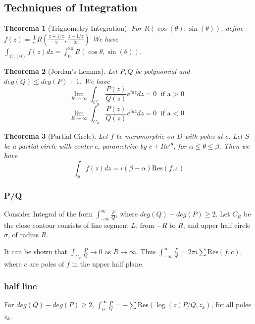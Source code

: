 \documentclass[12pt, a4paper]{article}
\newtheorem{theorem}{Theorema}[section]
\theoremstyle{definition}
\theoremstyle{remark}
\newcommand{\res}{\text{Res}}
\begin{document}

\subsection{Techniques of Integration} %
\label{sec:Techniques of Integration}

\begin{theorem}[Trignometry Integration]
For $ R(\cos(\theta), \sin(\theta))$, define $f(z) = \frac{1}{iz}R(\frac{z+1/z}{2}, \frac{z-1/z}{2i})$
We have $ \int_{C_1(0)} f(z) dz = \int^{2\pi}_{0} R(\cos{\theta}, \sin(\theta))$.
\end{theorem}

\begin{theorem}[Jordan's Lemma]
	Let $P,Q$ be polynomial and $deg(Q) \leq deg(P) + 1$. We have 
	$$
	\lim_{R \rightarrow  \infty} \int_{C_R^+} \frac{P(z)}{Q(z)} e^{iaz} dz = 0 \text{ if  a $>$ 0 }
	$$
	$$
	\lim_{R \rightarrow  \infty} \int_{C_R^-} \frac{P(z)}{Q(z)} e^{iaz} dz = 0 \text{ if a $<$ 0 }
	$$
\end{theorem}

\begin{theorem}[Partial Circle]
	Let $f$ be meromorphic on $D$ with poles at $c$. Let $S$ be a partial circle with center $c$, parametrize by $c + Re^{i\theta}$, for $\alpha \leq \theta \leq \beta$. Then we have 
	$$
	\int_{S} f(z) dz = i (\beta - \alpha) \res(f, c)
	$$
\end{theorem}


\subsubsection{P/Q}

Consider Integral of the form $\int_{- \infty}^{\infty}\frac{P}{Q}$, where $deg(Q) - deg(P) \geq 2$. Let $C_R$ be the close contour consists of line segment $L$, from $-R$ to $R$, and upper half circle$\sigma$, of radius $R$. 

It can be shown that $\int_{C_R} \frac{P}{Q} \rightarrow 0$ as $R \rightarrow \infty$. Thus  $\int_{-\infty}^{\infty} \frac{P}{Q} = 2\pi i \sum \res(f, c)$, where $c$ are poles of $f$ in the upper half plane.

\subsubsection{half line}
For $deg(Q) - deg(P) \geq 2$, $\int_{0}^{\infty}\frac{P}{Q} = - \sum \res(\log(z)P/Q, z_k )$, for all poles $z_k$.
\end{document}
